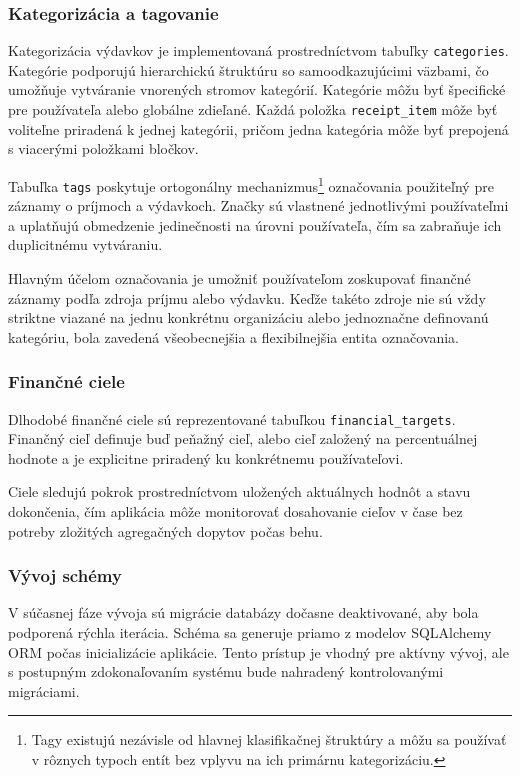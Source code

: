 \subsubsection{Kategorizácia a tagovanie}

Kategorizácia výdavkov je implementovaná prostredníctvom tabuľky \texttt{categories}. Kategórie podporujú hierarchickú štruktúru so samoodkazujúcimi väzbami, čo umožňuje vytváranie vnorených stromov kategórií. Kategórie môžu byť špecifické pre používateľa alebo globálne zdieľané. Každá položka \texttt{receipt\_item} môže byť voliteľne priradená k jednej kategórii, pričom jedna kategória môže byť prepojená s viacerými položkami bločkov.

Tabuľka \texttt{tags} poskytuje ortogonálny mechanizmus\footnote{Tagy existujú nezávisle od hlavnej klasifikačnej štruktúry a môžu sa používať v rôznych typoch entít bez vplyvu na ich primárnu kategorizáciu.} označovania použiteľný pre záznamy o príjmoch a výdavkoch. Značky sú vlastnené jednotlivými používateľmi a uplatňujú obmedzenie jedinečnosti na úrovni používateľa, čím sa zabraňuje ich duplicitnému vytváraniu.

Hlavným účelom označovania je umožniť používateľom zoskupovať finančné záznamy podľa zdroja príjmu alebo výdavku. Keďže takéto zdroje nie sú vždy striktne viazané na jednu konkrétnu organizáciu alebo jednoznačne definovanú kategóriu, bola zavedená všeobecnejšia a flexibilnejšia entita označovania.

\subsubsection{Finančné ciele}

Dlhodobé finančné ciele sú reprezentované tabuľkou \texttt{financial\_targets}. Finančný cieľ definuje buď peňažný cieľ, alebo cieľ založený na percentuálnej hodnote a je explicitne priradený ku konkrétnemu používateľovi.

Ciele sledujú pokrok prostredníctvom uložených aktuálnych hodnôt a stavu dokončenia, čím aplikácia môže monitorovať dosahovanie cieľov v čase bez potreby zložitých agregačných dopytov počas behu.

\subsubsection{Vývoj schémy}
\label{sec:schema-evolution}

V súčasnej fáze vývoja sú migrácie databázy dočasne deaktivované, aby bola podporená rýchla iterácia. Schéma sa generuje priamo z modelov SQLAlchemy ORM počas inicializácie aplikácie. Tento prístup je vhodný pre aktívny vývoj, ale s postupným zdokonaľovaním systému bude nahradený kontrolovanými migráciami.

